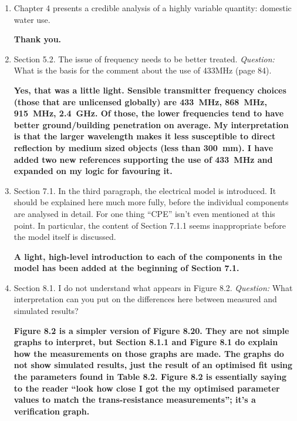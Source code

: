 \begin{enumerate}
      \item Chapter 4 presents a credible analysis of a highly variable quantity: domestic water use.

      \textbf{\textcolor{OliveGreen}{
        Thank you.
      }}

      \item Section 5.2. The issue of frequency needs to be better treated.
      \emph{Question:} What is the basis for the comment about the use of 433MHz (page 84).

      \textbf{\textcolor{OliveGreen}{
        Yes, that was a little light.
        Sensible transmitter frequency choices (those that are unlicensed globally) are \SI{433}{\mega\hertz}, \SI{868}{\mega\hertz}, \SI{915}{\mega\hertz}, \SI{2.4}{\giga\hertz}.
        Of those, the lower frequencies tend to have better ground/building penetration on average.
        My interpretation is that the larger wavelength makes it less susceptible to direct reflection by medium sized objects (less than \SI{300}{\milli\meter}).
        I have added two new references supporting the use of \SI{433}{\mega\hertz} and expanded on my logic for favouring it.
      }}

      \item Section 7.1. In the  third paragraph, the electrical model is introduced. It should be explained here much more fully, before the individual components are analysed in detail. For one thing ``CPE'' isn't even mentioned at this point. In particular, the  content of Section 7.1.1 seems inappropriate before the model itself is discussed.

      \textbf{\textcolor{OliveGreen}{
        A light, high-level introduction to each of the components in the model has been added at the beginning of Section 7.1.
      }}

      \item Section 8.1. I do not understand what appears in Figure 8.2.
      \emph{Question:} What interpretation can you put on the differences here between measured and simulated results?

      \textbf{\textcolor{OliveGreen}{
        Figure 8.2 is a simpler version of Figure 8.20.
        They are not simple graphs to interpret, but Section 8.1.1 and Figure 8.1 do explain how the measurements on those graphs are made.
        The graphs do not show simulated results, just the result of an optimised fit using the parameters found in Table 8.2.
        Figure 8.2 is essentially saying to the reader ``look how close I got the my optimised parameter values to match the trans-resistance measurements''; it's a verification graph.
      }}


\end{enumerate}
